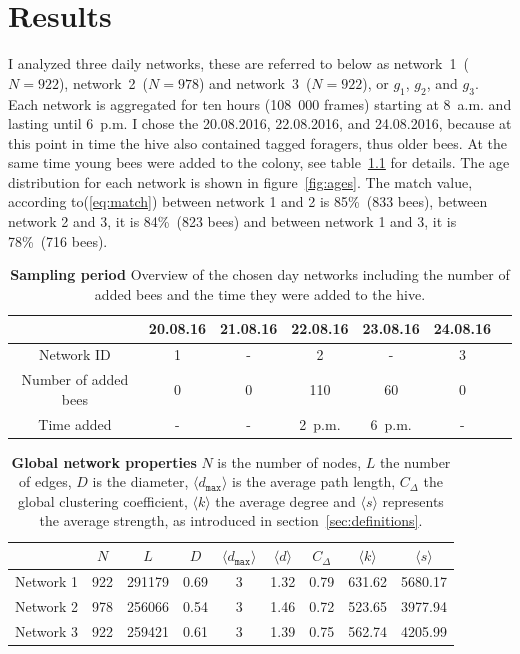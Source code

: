 \chapter{Results}
\label{ch:results}

I analyzed three daily networks, these are referred to below as network~1~($N=922$), network~2~($N=978$) and network~3~($N=922$), or $g_1$, $g_2$, and $g_3$. Each network is aggregated for ten hours (108~000 frames) starting at 8~a.m. and lasting until 6~p.m. I chose the 20.08.2016, 22.08.2016, and 24.08.2016, because at this point in time the hive also contained tagged foragers, thus older bees. At the same time young bees were added to the colony, see table~\ref{tab:networks} for details. The age distribution for each network is shown in figure~\ref{fig:ages}. The match value, according to(\ref{eq:match}) between network 1 and 2 is 85\%~(833 bees), between network 2 and 3, it is 84\%~(823 bees) and between network 1 and 3, it is 78\%~(716 bees).

\begin{table}[htb]
\centering
\caption[Sampling period]{\textbf{Sampling period} Overview of the chosen day networks including the number of added bees and the time they were added to the hive.}
\vspace*{5mm}
\begin{tabularx}{\textwidth}{ccccccc}
\toprule
{} & 20.08.16 & 21.08.16 & 22.08.16 & 23.08.16 & 24.08.16 \\
\midrule
Network ID & 1 & - & 2 & - & 3 & \\
Number of added bees & 0 & 0 & 110 & 60 & 0 \\
Time added & - & - & 2~p.m. & 6~p.m. & - \\
\bottomrule
\end{tabularx}
\label{tab:networks}
\end{table}


\begin{table}[htb]
\centering
\caption[Global network properties]{\textbf{Global network properties} $N$ is the number of nodes, $L$ the number of edges, $D$ is the diameter, $\langle d_{\texttt{max}} \rangle$ is the average path length, $C_\Delta$ the global clustering coefficient, $\langle k \rangle$ the average degree and $\langle s \rangle$ represents the average strength, as introduced in section~\ref{sec:definitions}.}
\label{tab:stats}
\vspace*{5mm}
\begin{tabularx}{\textwidth}{lcccccccc}
\toprule
{} &  $N$ &   $L$ &  $D$ &  $\langle d_{\texttt{max}} \rangle$ &  $\langle d \rangle$ &   $C_\Delta$ &  $\langle k \rangle$ &  $\langle s \rangle$ \\
\midrule
Network 1 &    922 &  291179 &     0.69 &         3 &              1.32 &  0.79 &      631.62 &      5680.17 \\
Network 2 &    978 &  256066 &     0.54 &         3 &              1.46 &  0.72 &      523.65 &      3977.94 \\
Network 3 &    922 &  259421 &     0.61 &         3 &              1.39 &  0.75 &      562.74 &      4205.99 \\
\bottomrule
\end{tabularx}
\end{table}


